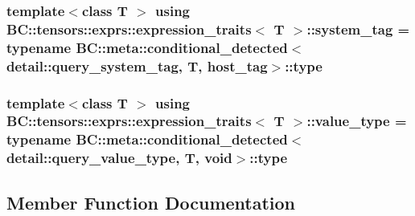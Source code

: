 \subsubsection[{\texorpdfstring{system\+\_\+tag}{system_tag}}]{\setlength{\rightskip}{0pt plus 5cm}template$<$class T $>$ using {\bf B\+C\+::tensors\+::exprs\+::expression\+\_\+traits}$<$ T $>$\+::{\bf system\+\_\+tag} =  typename {\bf B\+C\+::meta\+::conditional\+\_\+detected}$<${\bf detail\+::query\+\_\+system\+\_\+tag}, T, {\bf host\+\_\+tag}$>$\+::type}\hypertarget{structBC_1_1tensors_1_1exprs_1_1expression__traits_a15729391a3675a8a223645a666e69178}{}\label{structBC_1_1tensors_1_1exprs_1_1expression__traits_a15729391a3675a8a223645a666e69178}
\subsubsection[{\texorpdfstring{value\+\_\+type}{value_type}}]{\setlength{\rightskip}{0pt plus 5cm}template$<$class T $>$ using {\bf B\+C\+::tensors\+::exprs\+::expression\+\_\+traits}$<$ T $>$\+::{\bf value\+\_\+type} =  typename {\bf B\+C\+::meta\+::conditional\+\_\+detected}$<${\bf detail\+::query\+\_\+value\+\_\+type}, T, void$>$\+::type}\hypertarget{structBC_1_1tensors_1_1exprs_1_1expression__traits_ac886019065ee32295c353fc7cbb0e41a}{}\label{structBC_1_1tensors_1_1exprs_1_1expression__traits_ac886019065ee32295c353fc7cbb0e41a}


\subsection{Member Function Documentation}
